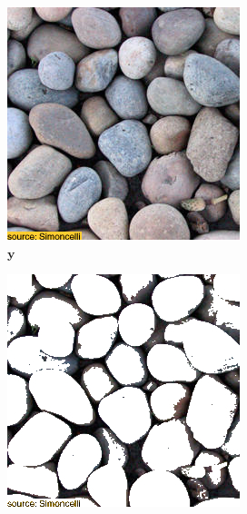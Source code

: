 \begin{figure}[]
\begin{subfigure}{\textwidth}
        \begin{subfigure}{0.24\textwidth}
            \centering
            \includegraphics[width=\textwidth]{images/04-experiment01/pebbles/target.jpg}
            \caption*{\(\bm{y}\)}
        \end{subfigure}
        \hfill
        \begin{subfigure}{0.24\textwidth}
            \centering
            \includegraphics[width=\textwidth]{images/04-experiment01/pebbles/threshold_bg.jpg}

\end{subfigure}
\end{subfigure}
\end{figure}
